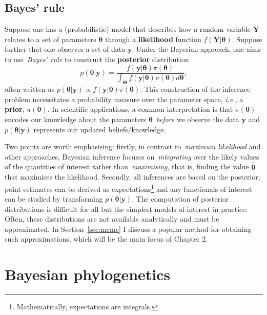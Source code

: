 \subsection{Bayes' rule}

Suppose one has a (probabilistic) model that describes how a random variable $\boldsymbol Y$ relates to a set of parameters $\boldsymbol\theta$ through a \textbf{likelihood} function $f(\boldsymbol Y| \boldsymbol\theta)$.
Suppose further that one observes a set of data $\boldsymbol y$.
Under the Bayesian approach, one aims to use~\textit{Bayes' rule} to construct the \textbf{posterior} distribution
\[ p(\boldsymbol\theta | \boldsymbol y) = \frac{f(\boldsymbol y| \boldsymbol\theta) \pi(\boldsymbol\theta)}{\int_{\boldsymbol\Theta}f(\boldsymbol y| \boldsymbol\theta) \pi(\boldsymbol\theta)d\boldsymbol\theta } ,\]
often written as $p(\boldsymbol\theta | \boldsymbol y) \propto f(\boldsymbol y | \boldsymbol\theta)\pi(\boldsymbol\theta)$.
This construction of the inference problem necessitates a probability measure over the parameter space, \textit{i.e.}, a \textbf{prior}, $\pi(\boldsymbol\theta)$.
In scientific applications, a common interpretation is that $\pi(\boldsymbol\theta)$ encodes our knowledge about the parameters $\boldsymbol\theta$~\textit{before} we observe the data $\boldsymbol y$ and $p(\boldsymbol\theta | \boldsymbol y)$ represents our updated beliefs/knowledge.

Two points are worth emphasising: firstly, in contrast to~\textit{maximum likelihood} and other approaches, Bayesian inference focuses on~\textit{integrating} over the likely values of the quantities of interest rather than~\textit{maximising}, that is, finding the value $\hat{\boldsymbol\theta}$ that maximises the likelihood.
Secondly, all inferences are based on the posterior; point estimates can be derived as expectations\footnote{Mathematically, expectations are integrals.} and any functionals of interest can be studied by transforming $p(\boldsymbol\theta | \boldsymbol y)$. 
The computation of posterior distributions is difficult for all but the simplest models of interest in practice.
Often, these distributions are not available analytically and must be approximated.
In Section~\ref{sec:mcmc} I discuss a popular method for obtaining such approximations, which will be the main focus of Chapter 2.

\section{Bayesian phylogenetics}
\label{sec:bayesian_phylogenetics}

